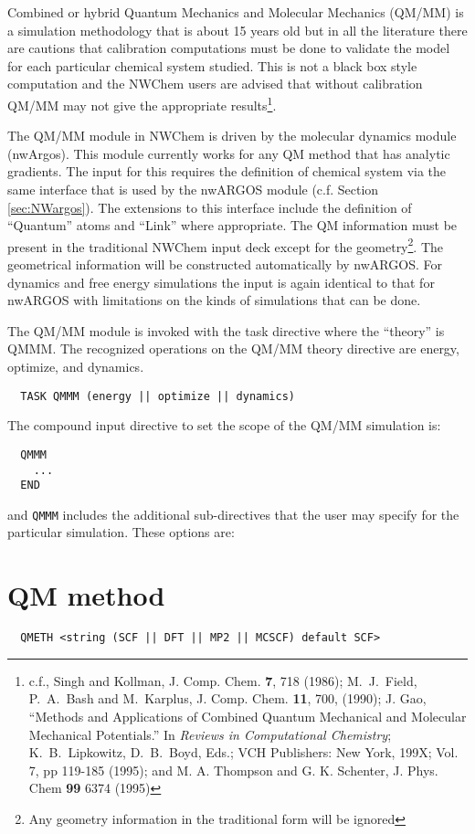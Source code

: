 
\label{sec:qmmm}

Combined or hybrid Quantum Mechanics and Molecular Mechanics (QM/MM)
is a simulation methodology that is about 15 years old but in all the
literature there are cautions that calibration computations must be
done to validate the model for each particular chemical system
studied.  This is not a black box style computation and the NWChem
users are advised that without calibration QM/MM may not give the
appropriate results\footnote{c.f., Singh and Kollman, J. Comp. Chem.
  {\bf 7}, 718 (1986); M.~J.~Field, P.~A.~Bash and M.~Karplus, J.
  Comp. Chem. {\bf 11}, 700, (1990); J. Gao, ``Methods and
  Applications of Combined Quantum Mechanical and Molecular Mechanical
  Potentials.'' In {\it Reviews in Computational Chemistry};
  K.~B.~Lipkowitz, D.~B.~Boyd, Eds.; VCH Publishers: New York, 199X;
  Vol. 7, pp 119-185 (1995); and M. A. Thompson and G. K. Schenter, J.
  Phys. Chem {\bf 99} 6374 (1995) }.

The QM/MM module in NWChem is driven by the molecular dynamics module
(nwArgos).  This module currently works for any QM method that has
analytic gradients.  The input for this requires the definition of
chemical system via the same interface that is used by the nwARGOS
module (c.f. Section \ref{sec:NWargos}).  The extensions to this
interface include the definition of ``Quantum'' atoms and ``Link''
where appropriate.  The QM information must be present in the
traditional NWChem input deck except for the geometry\footnote{Any
  geometry information in the traditional form will be ignored}.  The
geometrical information will be constructed automatically by nwARGOS.
For dynamics and free energy simulations the input is again identical
to that for nwARGOS with limitations on the kinds of simulations that
can be done.

The QM/MM module is invoked with the task directive where the
``theory'' is QMMM.  The recognized operations on the QM/MM theory
directive are energy, optimize, and dynamics.

\begin{verbatim}
  TASK QMMM (energy || optimize || dynamics)
\end{verbatim}

The compound input directive to set the scope of the QM/MM simulation
is: 
\begin{verbatim}
  QMMM
    ...
  END
\end{verbatim}

and \verb+QMMM+ includes the additional sub-directives that the user
may specify for the particular simulation.  These options are:

\section{QM method}
\begin{verbatim}
  QMETH <string (SCF || DFT || MP2 || MCSCF) default SCF>
\end{verbatim}




